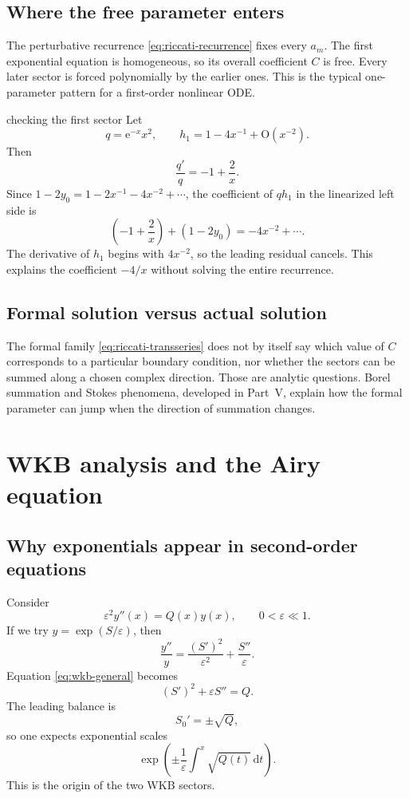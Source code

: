\documentclass[11pt,openany]{book}
\theoremstyle{plain}
\theoremstyle{definition}
\theoremstyle{remark}
\newcommand{\bigO}{\mathrm{O}}
\newcommand{\dd}{\,\mathrm{d}}
\newcommand{\e}{\mathrm{e}}
\begin{document}
\section{Where the free parameter enters}
The perturbative recurrence \cref{eq:riccati-recurrence} fixes every $a_m$. The first exponential equation is homogeneous, so its overall coefficient $C$ is free. Every later sector is forced polynomially by the earlier ones. This is the typical one-parameter pattern for a first-order nonlinear ODE.

\begin{workedbox}{checking the first sector}
Let
\[
  q=\e^{-x}x^2,
  \qquad h_1=1-4x^{-1}+\bigO(x^{-2}).
\]
Then
\[
  \frac{q'}q=-1+\frac2x.
\]
Since $1-2y_0=1-2x^{-1}-4x^{-2}+\cdots$, the coefficient of $qh_1$ in the linearized left side is
\[
  \left(-1+\frac2x\right)+(1-2y_0)
  =-4x^{-2}+\cdots.
\]
The derivative of $h_1$ begins with $4x^{-2}$, so the leading residual cancels. This explains the coefficient $-4/x$ without solving the entire recurrence.
\end{workedbox}

\section{Formal solution versus actual solution}
The formal family \cref{eq:riccati-transseries} does not by itself say which value of $C$ corresponds to a particular boundary condition, nor whether the sectors can be summed along a chosen complex direction. Those are analytic questions. Borel summation and Stokes phenomena, developed in Part~V, explain how the formal parameter can jump when the direction of summation changes.

\chapter{WKB analysis and the Airy equation}
\label{chap:wkb}

\section{Why exponentials appear in second-order equations}
Consider
\[
  \varepsilon^2 y''(x)=Q(x)y(x),
  \qquad 0<\varepsilon\ll1.
  \label{eq:wkb-general}
\]
If we try $y=\exp(S/\varepsilon)$, then
\[
  \frac{y''}{y}=\frac{(S')^2}{\varepsilon^2}
  +\frac{S''}{\varepsilon}.
\]
Equation \cref{eq:wkb-general} becomes
\[
  (S')^2+\varepsilon S''=Q.
\]
The leading balance is
\[
  S_0'=\pm\sqrt{Q},
\]
so one expects exponential scales
\[
  \exp\left(\pm\frac1\varepsilon
  \int^x\sqrt{Q(t)}\dd t\right).
\]
This is the origin of the two WKB sectors.
\end{document}
